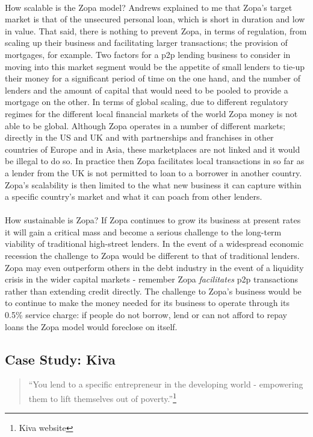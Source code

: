 \documentclass[12pt,a4paper,titlepage]{article}
\begin{document}
\paragraph{}How scalable is the Zopa model? Andrews explained to me that Zopa's target market is that of the unsecured personal loan, which is short in duration and low in value. That said, there is nothing to prevent Zopa, in terms of regulation, from scaling up their business and facilitating larger transactions; the provision of mortgages, for example. Two factors for a p2p lending business to consider in moving into this market segment would be the appetite of small lenders to tie-up their money for a significant period of time on the one hand, and the number of lenders and the amount of capital that would need to be pooled to provide a mortgage on the other. In terms of global scaling, due to different regulatory regimes for the different local financial markets of the world Zopa money is not able to be global. Although Zopa operates in a number of different markets; directly in the US and UK and with partnerships and franchises in other countries of Europe and in Asia, these marketplaces are not linked and it would be illegal to do so. In practice then Zopa facilitates local transactions in so far as a lender from the UK is not permitted to loan to a borrower in another country. Zopa's scalability is then limited to the what new business it can capture within a specific country's market and what it can poach from other lenders.

\paragraph{}How sustainable is Zopa? If Zopa continues to grow its business at present rates it will gain a critical mass and become a serious challenge to the long-term viability of traditional high-street lenders. In the event of a widespread economic recession the challenge to Zopa would be different to that of traditional lenders. Zopa may even outperform others in the debt industry in the event of a liquidity crisis in the wider capital markets - remember Zopa \textit{facilitates} p2p transactions rather than extending credit directly. The challenge to Zopa's business would be to continue to make the money needed for its business to operate through its 0.5\% service charge: if people do not borrow, lend or can not afford to repay loans the Zopa model would foreclose on itself.

\subsection{Case Study:  Kiva}
\singlespacing
\begin{quote}
``You lend to a specific entrepreneur in the developing world - empowering them to lift themselves out of poverty.''\footnote{Kiva website}
\end{quote}
\doublespacing
\end{document}
